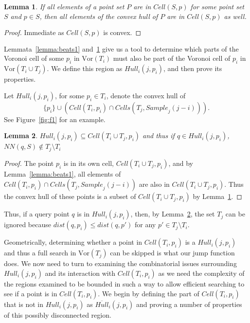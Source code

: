 \documentclass[12pt,a4paper,USenglish,cleveref, autoref, thm-restate]{article}
\newcommand{\Cell}{\mathit{Cell}}
\newcommand{\Cells}{\mathit{Cells}}
\newcommand{\Vor}{\mathrm{Vor}}
\newcommand{\Sample}{\mathit{Sample}}
\newcommand{\Hull}{\mathit{Hull}}
\newcommand{\NN}{\mathit{NN}}
\newtheorem{lemma}{Lemma}
\newcommand{\Cell}{\mathit{Cell}}
\newcommand{\Cells}{\mathit{Cells}}
\newcommand{\Vor}{\mathrm{Vor}}
\newcommand{\Sample}{\mathit{Sample}}
\newcommand{\Hull}{\mathit{Hull}}
\newcommand{\NN}{\mathit{NN}}
\newcommand{\Cell}{\mathit{Cell}}
\newcommand{\Cells}{\mathit{Cells}}
\newcommand{\Vor}{\mathrm{Vor}}
\newcommand{\Sample}{\mathit{Sample}}
\newcommand{\Hull}{\mathit{Hull}}
\newcommand{\NN}{\mathit{NN}}
\begin{document}
\begin{lemma} \label{lemma:convex}
    If all elements of a point set $P$ are in $\Cell(S,p)$ for some point set $S$ and $p\in S$, then all elements of the convex hull of $P$ are in  $\Cell(S,p)$ as well.
\end{lemma}

\begin{proof}
    Immediate as $\Cell(S,p)$ is convex.
\end{proof}

Lemmata~\ref{lemma:beats1} and~\ref{lemma:convex} give us a tool to determine which parts of the Voronoi cell of some $p_i$ in $\Vor(T_i)$ must also be part of the Voronoi cell of $p_i$ in $\Vor(T_i \cup T_j)$. We define this region as $\Hull_i(j,p_i)$, and then prove its properties.


Let $\Hull_i(j,p_i)$, for some $p_i \in T_i$,  denote the convex hull of
\[ \{p_i\} \cup ( \Cell(T_i,p_i) \cap   \Cells(T_j,\Sample_j(j-i)) ) .\]
See Figure~\ref{fig:f1} for an example.
\begin{lemma} \label{lemma:hull}
$\Hull_i(j,p_i) \subseteq \Cell(T_i \cup T_j,p_i)$ and thus if $q\in \Hull_i(j,p_i)$, $\NN(q,S) \not \in T_j \setminus T_i$
\end{lemma}
\begin{proof}
The point $p_i$ is in its own cell, $\Cell(T_i \cup T_j,p_i)$, and by Lemma~\ref{lemma:beats1}, 
all elements of $\Cell(T_i,p_i) \cap   \Cells(T_j,\Sample_j(j-i))$
are also in $\Cell(T_i \cup T_j,p_i)$. Thus the convex hull of these points is a subset of 
$\Cell(T_i \cup T_j,p_i)$ by Lemma~\ref{lemma:convex}.
\end{proof}
Thus, if a query point $q$ is in $\Hull_i(j,p_i)$, then, by Lemma~\ref{lemma:hull},  the set $T_j$ can be ignored because $dist(q,p_i)\le dist(q,p')$ for any $p'\in T_j \setminus T_i$.

Geometrically, determining whether a point in $\Cell(T_i,p_i)$ is a $\Hull_i(j,p_i)$ and thus a full search in $\Vor(T_j)$ can be skipped is what our jump function does. We now need to turn to examining the combinatorial issues surrounding $\Hull_i(j,p_i)$ and its interaction with $\Cell(T_i,p_i)$ as we need the complexity of the regions examined to be bounded in such a way to allow efficient searching to see if a point is in $\Cell(T_i,p_i)$. We begin by defining the part of $\Cell(T_i,p_i)$ that is not in $\Hull_i(j,p_i)$ as $\overline{\Hull}_i(j,p_i)$ and proving a number of properties of this possibly disconnected region.
\end{document}
